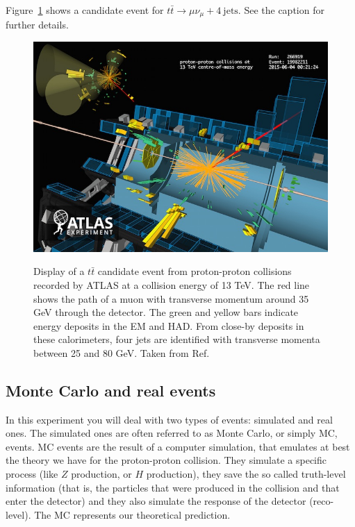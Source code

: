Figure~\ref{fig:ttbar_eventdisplay} shows a candidate event for $t\bar{t} \rightarrow \mu \nu_{\mu} + 4\ \mathrm{jets}$. See the caption for further details. 

\begin{figure}[tb] 
	\centering
	\includegraphics[width=0.7\columnwidth]{Figures/ATLAS_ttbar_candidate_13TeV_VP1_run266919_evt19982211_thumb.jpg}
	\label{fig:ttbar_eventdisplay}
	\caption{Display of a $t\bar{t}$ candidate event from proton-proton collisions recorded by ATLAS at a collision energy of 13 TeV. The red line shows the path of a muon with transverse momentum around 35 GeV through the detector. The green and yellow bars indicate energy deposits in the EM and HAD. From close-by deposits in these calorimeters, four jets are identified with transverse momenta between 25 and 80 GeV. Taken from Ref.~\cite{ATLAS_ttbar_evtdisplay}}
\end{figure}

\subsection{Monte Carlo and real events}

In this experiment you will deal with two types of events: simulated and real ones. The simulated ones are often referred to as Monte Carlo, or simply MC, events. MC events are the result of a computer simulation, that emulates at best the theory we have for the proton-proton collision. They simulate a specific process (like $Z$ production, or $H$ production), they save the so called truth-level information (that is, the particles that were produced in the collision and that enter the detector) and they also simulate the response of the detector (reco-level). The MC represents our theoretical prediction. 


